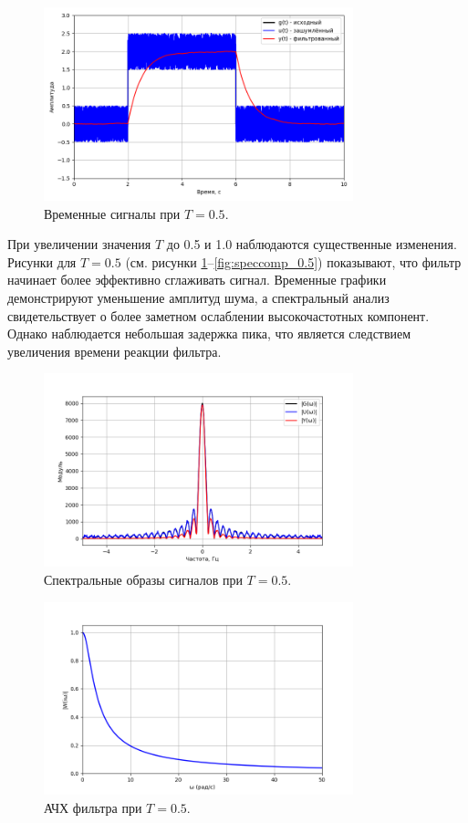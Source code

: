 \documentclass[a4paper]{article}
\begin{document}
\begin{figure}[H]
    \centering
    \includegraphics[width=0.8\textwidth]{src/task_1_1/time_2.0_0.5.png}
    \caption{Временные сигналы при \(T=0.5\).}
    \label{fig:time_0.5}
\end{figure}
\noindent При увеличении значения \(T\) до 0.5 и 1.0 наблюдаются существенные изменения. Рисунки для \(T=0.5\) (см. рисунки \ref{fig:time_0.5}--\ref{fig:speccomp_0.5}) показывают, что фильтр начинает более эффективно сглаживать сигнал. Временные графики демонстрируют уменьшение амплитуд шума, а спектральный анализ свидетельствует о более заметном ослаблении высокочастотных компонент. Однако наблюдается небольшая задержка пика, что является следствием увеличения времени реакции фильтра.

\begin{figure}[H]
  \centering
  \includegraphics[width=0.8\textwidth]{src/task_1_1/spec_2.0_0.5.png}
  \caption{Спектральные образы сигналов при \(T=0.5\).}
  \label{fig:spec_0.5}
\end{figure}

\begin{figure}[H]
  \centering
  \includegraphics[width=0.8\textwidth]{src/task_1_1/ach_2.0_0.5.png}
  \caption{АЧХ фильтра при \(T=0.5\).}
  \label{fig:ach_0.5}
\end{figure}
\end{document}
